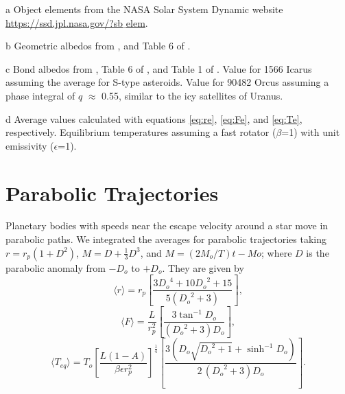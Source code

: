 \documentclass[a4paper,fleqn,usenatbib]{mnras}
\begin{document}
\begin{table}
\begin{threeparttable}
\begin{tabular}{ l c c c c c c c c }
 \hline
 \hline
\end{tabular}
\label{tab:elliptic}
	\begin{tablenotes}
	\small
\item[a]{Object elements from the NASA Solar System Dynamic website \href{https://ssd.jpl.nasa.gov/?sb$\_$elem}{https://ssd.jpl.nasa.gov/?sb$\_$elem}.}
\item[b] {Geometric albedos from \citet{2004come.book..223L,2010AJ....139.2700B,2011Natur.478..493S,2012A&A...541L...6P,2015ApJ...814..117N,2015Sci...347a0628C,2015Icar..252..393T,2016AJ....151..117P}, and Table 6 of \citet{2013Icar..226.1252L}.}
\item[c] {Bond albedos from \citet{1981motc.conf...83C,1987Icar...69...33H,2004Icar..167..129B,2010AJ....139.2700B,2011Natur.478..493S,2015Icar..252..393T,2017arXiv170302670M,2017Icar..287..207B}, Table 6 of \citet{2013Icar..226.1252L}, and Table 1 of \citet{2015ApJ...809...43J}. Value for 1566 Icarus assuming the average for S-type asteroids. Value for 90482 Orcus assuming a phase integral of $q$ $\approx$ 0.55, similar to the icy satellites of Uranus.}
\item[d]{Average values calculated with equations \ref{eq:re}, \ref{eq:Fe}, and \ref{eq:Te}, respectively. Equilibrium temperatures assuming a fast rotator ($\beta$=1) with unit emissivity ($\epsilon$=1).}
	\end{tablenotes}
\end{threeparttable}
\end{table}


\section{Parabolic Trajectories}
\label{sec:parabolic}
Planetary bodies with speeds near the escape velocity around a star move in parabolic paths. We integrated the averages for parabolic trajectories taking $r=r_p(1+D^2)$, $M=D+\frac{1}{3}D^3$, and $M=(2M_o/T)t-Mo$; where $D$ is the parabolic anomaly from $-D_o$ to $+D_o$. They are given by
\begin{equation} \label{eq:rp}
\langle r \rangle = r_p \left[ \frac{3 {D_o}^{4} + 10 {D_o}^{2} + 15}{5 \left({D_o}^{2} + 3\right)} \right],
\end{equation}
\begin{equation} \label{eq:Fp}
\langle F \rangle = \frac{L}{r_p^2} \left[ \frac{3 \tan^{-1} D_o}{{\left({D_o}^2 + 3\right)} D_o} \right],
\end{equation}
\begin{equation} \label{eq:Tp}
\langle T_{eq} \rangle = T_o \left[\frac{L {\left(1 - A\right)}}{\beta \epsilon r_p^{2}}\right]^{\frac{1}{4}} \left[ \frac{3 {\left(D_o\sqrt{{D_o}^{2} + 1} + \sinh^{-1} D_o \right)}}{2 \, {\left({D_o}^{2} + 3\right)} D_o} \right].
\end{equation}
\end{document}

